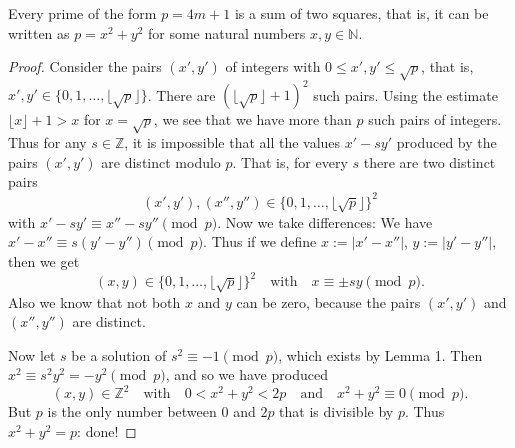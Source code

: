 \begin{proposition}
  \label{ch04.proposition1}
  \leanok
  Every prime of the form \(p = 4m + 1\) is a sum of two squares,
  that is, it can be written as \(p = x^2 + y^2\) for some natural numbers \(x,y \in \mathbb{N}\).
\end{proposition}
\begin{proof}
  Consider the pairs $(x', y')$ of integers with $0 \leq x', y' \leq \sqrt{p}$, that is,
  $x', y' \in \{0, 1, \dots, \lfloor \sqrt{p} \rfloor\}$.
  There are $(\lfloor \sqrt{p} \rfloor + 1)^2$ such pairs.
  Using the estimate $\lfloor x \rfloor + 1 > x$ for $x = \sqrt{p}$, we see that we have more
  than $p$ such pairs of integers. Thus for any $s \in \mathbb{Z}$, it is impossible that all
  the values $x' - sy'$ produced by the pairs $(x', y')$ are distinct modulo $p$. That is, for
  every $s$ there are two distinct pairs
  \[
  (x', y'), (x'', y'') \in \{0, 1, \dots, \lfloor \sqrt{p} \rfloor\}^2
  \]
  with $x' - sy' \equiv x'' - sy'' \pmod{p}$. Now we take differences:
  We have $x' - x'' \equiv s(y' - y'') \pmod{p}$. Thus if we define
  $x := |x' - x''|$, $y := |y' - y''|$, then we get
  \[
  (x, y) \in
  \{0, 1, \dots, \lfloor \sqrt{p} \rfloor\}^2 \quad \text{with} \quad x \equiv \pm sy \pmod{p}.
  \]
  Also we know that not both $x$ and $y$ can be zero, because the pairs $(x', y')$ and $(x'', y'')$
  are distinct.

  Now let $s$ be a solution of $s^2 \equiv -1 \pmod{p}$, which exists by Lemma 1.
  Then $x^2 \equiv s^2 y^2 = -y^2 \pmod{p}$, and so we have produced
  \[
  (x, y) \in
  \mathbb{Z}^2 \quad \text{with} \quad
  0 < x^2 + y^2 < 2p \quad \text{and} \quad x^2 + y^2 \equiv 0 \pmod{p}.
  \]
  But $p$ is the only number between $0$ and $2p$ that is divisible by $p$.
  Thus $x^2 + y^2 = p$: done!
\end{proof}

